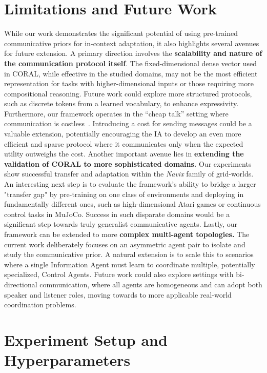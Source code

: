 \documentclass[letterpaper]{article}
\begin{document}
\begin{appendix}
\section{Limitations and Future Work}
While our work demonstrates the significant potential of using pre-trained communicative priors for in-context adaptation, it also highlights several avenues for future extension.
A primary direction involves the \textbf{scalability and nature of the communication protocol itself}. The fixed-dimensional dense vector used in CORAL, while effective in the studied domains, may not be the most efficient representation for tasks with higher-dimensional inputs or those requiring more compositional reasoning. Future work could explore more structured protocols, such as discrete tokens from a learned vocabulary, to enhance expressivity. Furthermore, our framework operates in the ``cheap talk'' setting where communication is costless~\cite{crawford82signaling,lowe2019pitfalls, tao23pot, yang-tao25misinformation}. Introducing a cost for sending messages could be a valuable extension, potentially encouraging the IA to develop an even more efficient and sparse protocol where it communicates only when the expected utility outweighs the cost.
Another important avenue lies in \textbf{extending the validation of CORAL to more sophisticated domains.} Our experiments show successful transfer and adaptation within the \textit{Navix} family of grid-worlds. An interesting next step is to evaluate the framework's ability to bridge a larger "transfer gap" by pre-training on one class of environments and deploying in fundamentally different ones, such as high-dimensional Atari games or continuous control tasks in MuJoCo. Success in such disparate domains would be a significant step towards truly generalist communicative agents.
Lastly, our framework can be extended to more \textbf{complex multi-agent topologies.} The current work deliberately focuses on an asymmetric agent pair to isolate and study the communicative prior. A natural extension is to scale this to scenarios where a single Information Agent must learn to coordinate multiple, potentially specialized, Control Agents. Future work could also explore settings with bi-directional communication, where all agents are homogeneous and can adopt both speaker and listener roles, moving towards to more applicable real-world coordination problems.
\section{Experiment Setup and Hyperparameters}
\label{appendix:hyperparameters_and_setup}

\end{appendix}
\end{document}
